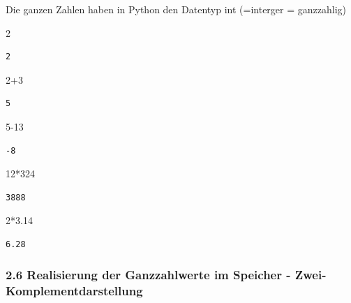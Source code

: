 \documentclass[
  11pt,
  a4paper,
  DIV=11,
  numbers=noendperiod]{scrartcl}
\newenvironment{Shaded}{\begin{snugshade}}{\end{snugshade}}
\newcommand{\DecValTok}[1]{\textcolor[rgb]{0.68,0.00,0.00}{#1}}
\newcommand{\FloatTok}[1]{\textcolor[rgb]{0.68,0.00,0.00}{#1}}
\newcommand{\OperatorTok}[1]{\textcolor[rgb]{0.37,0.37,0.37}{#1}}
\begin{document}
Die ganzen Zahlen haben in Python den Datentyp int (=interger =
ganzzahlig)

\begin{Shaded}
\begin{Highlighting}[numbers=left,,]
\DecValTok{2}
\end{Highlighting}
\end{Shaded}

\begin{verbatim}
2
\end{verbatim}

\begin{Shaded}
\begin{Highlighting}[numbers=left,,]
\DecValTok{2}\OperatorTok{+}\DecValTok{3}
\end{Highlighting}
\end{Shaded}

\begin{verbatim}
5
\end{verbatim}

\begin{Shaded}
\begin{Highlighting}[numbers=left,,]
\DecValTok{5}\OperatorTok{{-}}\DecValTok{13}
\end{Highlighting}
\end{Shaded}

\begin{verbatim}
-8
\end{verbatim}

\begin{Shaded}
\begin{Highlighting}[numbers=left,,]
\DecValTok{12}\OperatorTok{*}\DecValTok{324}
\end{Highlighting}
\end{Shaded}

\begin{verbatim}
3888
\end{verbatim}

\begin{Shaded}
\begin{Highlighting}[numbers=left,,]
\DecValTok{2}\OperatorTok{*}\FloatTok{3.14}
\end{Highlighting}
\end{Shaded}

\begin{verbatim}
6.28
\end{verbatim}

\subsubsection{2.6 Realisierung der Ganzzahlwerte im Speicher -
Zwei-Komplementdarstellung}\label{realisierung-der-ganzzahlwerte-im-speicher---zwei-komplementdarstellung}
\end{document}
